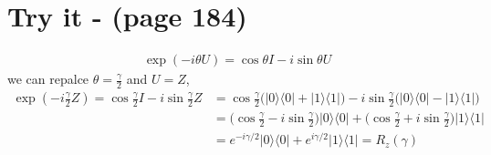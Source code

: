 \documentclass{article}
\newcommand{\op}[2]{|#1\rangle \langle#2|}
\begin{document}
\section*{Try it - (page 184)}
\begin{align*}
   \exp(-i\theta U) = \cos\theta I - i\sin\theta U
\end{align*}
we can repalce $\theta=\displaystyle\frac{\gamma}{2}$ and $U = Z$,
\begin{align*}
   \exp(-i\frac{\gamma}{2} Z) = \cos\frac{\gamma}{2} I - i\sin\frac{\gamma}{2} Z &= \cos\frac{\gamma}{2}\big(\op{0}{0}+\op{1}{1}\big) - i\sin\frac{\gamma}{2}\big(\op{0}{0}-\op{1}{1}\big) \\
   &= \big(\cos\frac{\gamma}{2} - i\sin\frac{\gamma}{2}\big)\op{0}{0} + \big(\cos\frac{\gamma}{2} + i\sin\frac{\gamma}{2}\big)\op{1}{1} \\
   &= e^{-i\gamma/2}\op{0}{0} + e^{i\gamma/2}\op{1}{1} = R_{z}(\gamma)
\end{align*}
\end{document}
